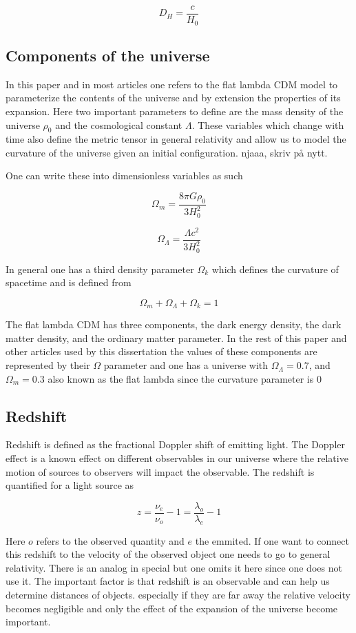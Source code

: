 \documentclass{article}
\begin{document}
$$
D_H = \frac{c}{H_0}
$$

\subsection{Components of the universe}
In this paper and in most articles one refers to the flat lambda CDM model to parameterize the contents of the universe and by extension the properties of its expansion. Here two important parameters to define are the mass density of the universe $\rho_0$ and the cosmological constant $\Lambda$. These variables which change with time also define the metric tensor in general relativity and allow us to model the curvature of the universe given an initial configuration.  njaaa, skriv på nytt. 

One can write these into dimensionless variables as such

$$
\Omega_m = \frac{8\pi G\rho_0}{3H_0^2}
$$

$$
\Omega_\Lambda = \frac{\Lambda c^2}{3H_0^2}
$$



In general one has a third density parameter $\Omega_k$ which defines the curvature of spacetime and is defined from 

$$
\Omega_m + \Omega_\Lambda + \Omega_k = 1
$$



The flat lambda CDM has three components, the dark energy density, the dark matter density, and the ordinary matter parameter. In the rest of this paper and other articles used by this dissertation the values of these components are represented by their $\Omega$ parameter and one has a universe with $\Omega_\Lambda = 0.7$, and $\Omega_m = 0.3$ also known as the flat lambda since the curvature parameter is $0$


\subsection{Redshift}
Redshift is defined as the fractional Doppler shift of emitting light. The Doppler effect is a known effect on different observables in our universe where the relative motion of sources to observers will impact the observable. The redshift is quantified for a light source as 

\begin{equation}
    z = \frac{\nu_e}{\nu_o}-1 = \frac{\lambda_o}{\lambda_e}-1
\end{equation}

Here $o$ refers to the observed quantity and $e$ the emmited. 
If one want to connect this redshift to the velocity of the observed object one needs to go to general relativity. 
There is an analog in special but one omits it here since one does not use it.
The important factor is that redshift is an observable and can help us determine distances of objects. 
especially if they are far away the relative velocity becomes negligible and 
only the effect of the expansion of the universe become important. 
\end{document}
